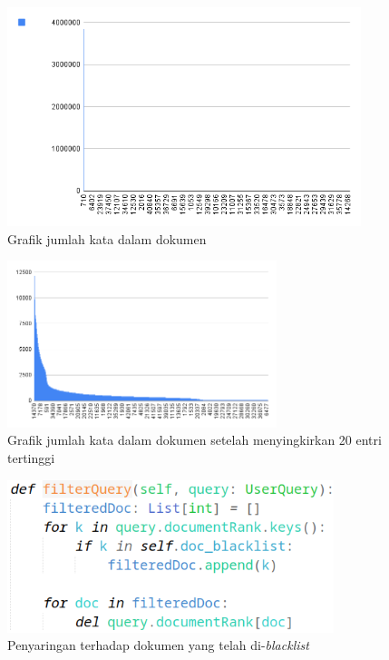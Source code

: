 \begin{figure}[H]
  \centering{}
	\includegraphics[width=0.92\textwidth]{gambar/word_count}
  \caption{Grafik jumlah kata dalam dokumen}
\end{figure}

\begin{figure}[H]
  \centering{}
	\includegraphics[width=0.7\textwidth]{gambar/word_count2}
  \caption{Grafik jumlah kata dalam dokumen setelah menyingkirkan 20 entri 
  tertinggi}
\end{figure}

\begin{figure}[H]
  \centering{}
	\includegraphics[width=0.85\textwidth]{gambar/implementasi_filterquery}
  \caption{Penyaringan terhadap dokumen yang telah di-\textit{blacklist}}
\end{figure}

